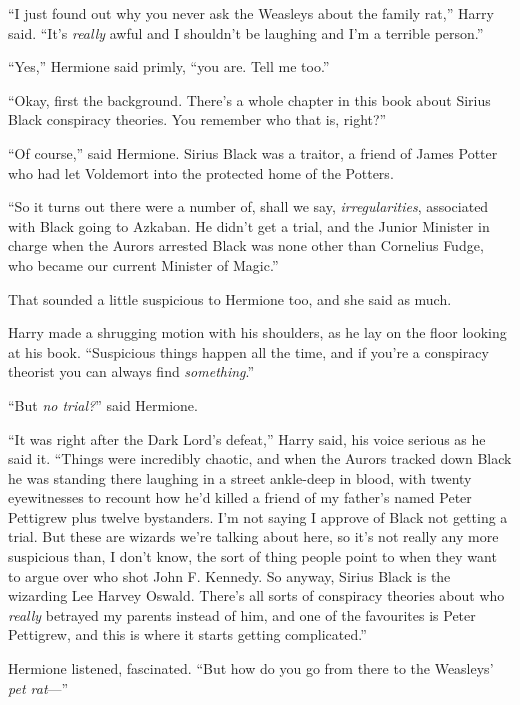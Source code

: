 “I just found out why you never ask the Weasleys about the family rat,” Harry said. “It’s \emph{really} awful and I shouldn’t be laughing and I’m a terrible person.”

“Yes,” Hermione said primly, “you are. Tell me too.”

“Okay, first the background. There’s a whole chapter in this book about Sirius Black conspiracy theories. You remember who that is, right?”

“Of course,” said Hermione. Sirius Black was a traitor, a friend of James Potter who had let Voldemort into the protected home of the Potters.

“So it turns out there were a number of, shall we say, \emph{irregularities}, associated with Black going to Azkaban. He didn’t get a trial, and the Junior Minister in charge when the Aurors arrested Black was none other than Cornelius Fudge, who became our current Minister of Magic.”

That sounded a little suspicious to Hermione too, and she said as much.

Harry made a shrugging motion with his shoulders, as he lay on the floor looking at his book. “Suspicious things happen all the time, and if you’re a conspiracy theorist you can always find \emph{something}.”

“But \emph{no trial?}” said Hermione.

“It was right after the Dark Lord’s defeat,” Harry said, his voice serious as he said it. “Things were incredibly chaotic, and when the Aurors tracked down Black he was standing there laughing in a street ankle-deep in blood, with twenty eyewitnesses to recount how he’d killed a friend of my father’s named Peter Pettigrew plus twelve bystanders. I’m not saying I approve of Black not getting a trial. But these are wizards we’re talking about here, so it’s not really any more suspicious than, I don’t know, the sort of thing people point to when they want to argue over who shot John F. Kennedy. So anyway, Sirius Black is the wizarding Lee Harvey Oswald. There’s all sorts of conspiracy theories about who \emph{really} betrayed my parents instead of him, and one of the favourites is Peter Pettigrew, and this is where it starts getting complicated.”

Hermione listened, fascinated. “But how do you go from there to the Weasleys’ \emph{pet rat}—”


